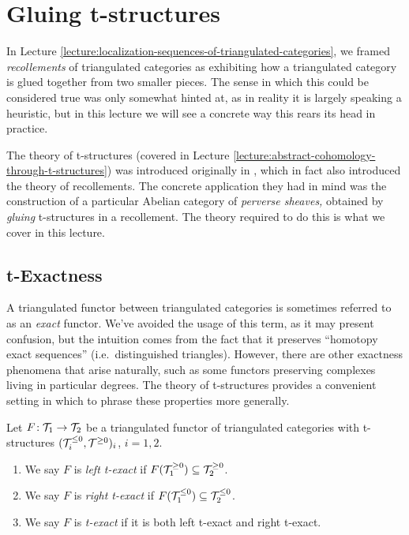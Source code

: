 
\section{Gluing t-structures}\label{lecture:gluing-t-structures}
In Lecture \ref{lecture:localization-sequences-of-triangulated-categories}, we framed \emph{recollements} of triangulated categories as exhibiting how a triangulated category
is glued together from two smaller pieces. The sense in which this could be considered true was only somewhat hinted at, as in reality it is largely speaking a heuristic,
but in this lecture we will see a concrete way this rears its head in practice.

The theory of t-structures (covered in Lecture \ref{lecture:abstract-cohomology-through-t-structures}) was introduced originally in \cite{faisceaux-pervers}, which in fact also
introduced the theory of recollements. The concrete application they had in mind was the construction of a particular Abelian category of \emph{perverse sheaves,} obtained
by \emph{gluing} t-structures in a recollement. The theory required to do this is what we cover in this lecture.

\subsection{t-Exactness}
A triangulated functor between triangulated categories is sometimes referred to as an \emph{exact} functor. We've avoided the usage of this term, as it may present confusion,
but the intuition comes from the fact that it preserves ``homotopy exact sequences'' (i.e.\ distinguished triangles). However, there are other exactness phenomena that arise
naturally, such as some functors preserving complexes living in particular degrees. The theory of t-structures provides a convenient setting in which to phrase these
properties more generally.

\begin{definition}
	Let \(F\!:\mathcal{T}_1 \to \mathcal{T}_2\) be a triangulated functor of triangulated categories with t-structures \((\mathcal{T}^{\leq 0}_i,\mathcal{T}^{\geq 0})_i\), \(i=1,2\).
	\begin{enumerate}[label=(\arabic*)]
		\item We say \(F\) is \emph{left t-exact} if \(F(\mathcal{T}^{\geq 0}_1) \subseteq \mathcal{T}^{\geq 0}_2\).
		\item We say \(F\) is \emph{right t-exact} if \(F(\mathcal{T}^{\leq 0}_1) \subseteq \mathcal{T}^{\leq 0}_2\).
		\item We say \(F\) is \emph{t-exact} if it is both left t-exact and right t-exact.
	\end{enumerate}
\end{definition}

